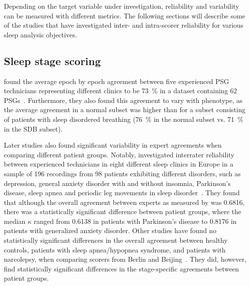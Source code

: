         Depending on the target variable under investigation, reliability and variability can be measured with different metrics.
        The following sections will describe some of the studies that have investigated inter- and intra-scorer reliability for various sleep analysis objectives.
        
        
        \subsection{Sleep stage scoring}\label{sec:challenges-sleep-stage-scoring}
        
            \citeauthor{Norman2000} found the average epoch by epoch agreement between five experienced PSG technicians representing different clinics to be \SI{73}{\percent} in a dataset containing 62 PSGs~\cite{Norman2000}.
            Furthermore, they also found this agreement to vary with phenotype, as the average agreement in a normal subset was higher than for a subset consisting of patients with sleep disordered breathing (\SI{76}{\percent} in the normal subset vs. \SI{71}{\percent} in the SDB subset).
            
            Later studies also found significant variability in expert agreements when comparing different patient groups. 
            Notably, \citeauthor{Danker-Hopfe2004} investigated interrater reliability between experienced technicians in eight different sleep clinics in Europe in a sample of 196 recordings from 98 patients exhibiting different disorders, such as depression, general anxiety disorder with and without insomnia, Parkinson's disease, sleep apnea and periodic leg movements in sleep disorder~\cite{Danker-Hopfe2004}.
            They found that although the overall agreement between experts as measured by \cohen{} was \num{0.6816}, there was a statistically significant difference between patient groups, where the median $\kappa$ ranged from \num{0.6138} in patients with Parkinson's disease to \num{0.8176} in patients with generalized anxiety disorder.
            Other studies have found no statistically significant differences in the overall agreement between healthy controls, patients with sleep apnea/hypopnea syndrome, and patients with narcolepsy, when comparing scorers from Berlin and Beijing~\cite{Zhang2015a}. 
            They did, however, find statistically significant differences in the stage-specific agreements between patient groups.
            
